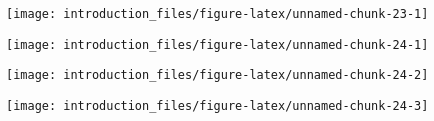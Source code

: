 \documentclass[
]{article}
\newenvironment{Shaded}{\begin{snugshade}}{\end{snugshade}}
\newcommand{\NormalTok}[1]{#1}
\newcommand{\SpecialCharTok}[1]{\textcolor[rgb]{0.81,0.36,0.00}{\textbf{#1}}}
\begin{document}
\begin{Shaded}
\end{Shaded}

\begin{center}\texttt{[image: introduction\_files/figure-latex/unnamed-chunk-23-1]} \end{center}

\begin{Shaded}
\end{Shaded}

\begin{center}\texttt{[image: introduction\_files/figure-latex/unnamed-chunk-24-1]} \end{center}

\begin{Shaded}
\end{Shaded}

\begin{center}\texttt{[image: introduction\_files/figure-latex/unnamed-chunk-24-2]} \end{center}

\begin{Shaded}
\end{Shaded}

\begin{center}\texttt{[image: introduction\_files/figure-latex/unnamed-chunk-24-3]} \end{center}
\end{document}
